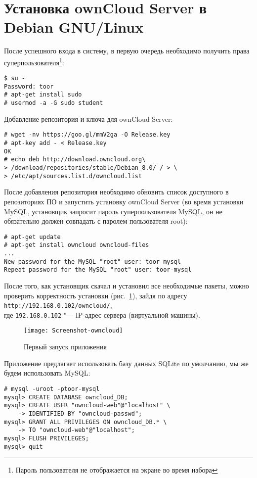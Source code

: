 \section{Установка ownCloud Server в Debian GNU/Linux} \label{pril:c}

После успешного входа в систему, в первую очередь необходимо получить права суперпользователя\footnote{Пароль пользователя не отображается на экране во время набора}:
\begin{lstlisting}
$ su -
Password: toor
# apt-get install sudo
# usermod -a -G sudo student
\end{lstlisting}

Добавление репозитория и ключа для ownCloud Server:
\begin{lstlisting}
# wget -nv https://goo.gl/mmV2ga -O Release.key
# apt-key add - < Release.key
OK
# echo deb http://download.owncloud.org\
> /download/repositories/stable/Debian_8.0/ / > \
> /etc/apt/sources.list.d/owncloud.list
\end{lstlisting}

После добавления репозитория необходимо обновить список доступного в репозиториях ПО и запустить установку ownCloud Server (во время установки MySQL, установщик запросит пароль суперпользователя MySQL, он не обязательно должен совпадать с паролем пользователя root):
\begin{lstlisting}
# apt-get update
# apt-get install owncloud owncloud-files
...
New password for the MySQL "root" user: toor-mysql
Repeat password for the MySQL "root" user: toor-mysql
\end{lstlisting}

После того, как установщик скачал и установил все необходимые пакеты, можно проверить корректность установки (рис.~\ref{pic:first-own}), зайдя по адресу \texttt{http://192.168.0.102/owncloud/}, \\
где \texttt{192.168.0.102} "--- IP-адрес сервера (виртуальной машины).

\begin{figure}[ht]
    \centering
	\texttt{[image: Screenshot-owncloud]}
	\caption{Первый запуск приложения}\label{pic:first-own}
\end{figure}

Приложение предлагает использовать базу данных SQLite по умолчанию, мы же будем использовать MySQL:
\begin{lstlisting}
# mysql -uroot -ptoor-mysql
mysql> CREATE DATABASE owncloud_DB;
mysql> CREATE USER "owncloud-web"@"localhost" \
    -> IDENTIFIED BY "owncloud-passwd";
mysql> GRANT ALL PRIVILEGES ON owncloud_DB.* \
    -> TO "owncloud-web"@"localhost";
mysql> FLUSH PRIVILEGES;
mysql> quit
\end{lstlisting}

